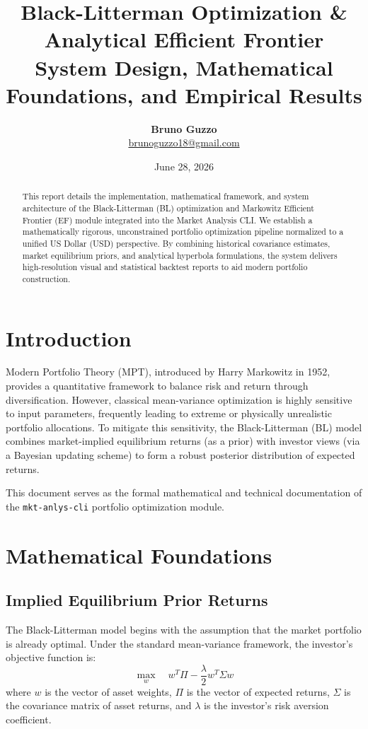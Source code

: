 \documentclass[11pt,a4paper]{article}
\title{\textbf{\Large Black-Litterman Optimization \& Analytical Efficient Frontier}\\
\large System Design, Mathematical Foundations, and Empirical Results}
\author{\textbf{Bruno Guzzo} \\ \href{mailto:brunoguzzo18@gmail.com}{brunoguzzo18@gmail.com}}
\date{June 28, 2026}
\begin{document}
\maketitle

\begin{abstract}
This report details the implementation, mathematical framework, and system architecture of the Black-Litterman (BL) optimization and Markowitz Efficient Frontier (EF) module integrated into the Market Analysis CLI. We establish a mathematically rigorous, unconstrained portfolio optimization pipeline normalized to a unified US Dollar (USD) perspective. By combining historical covariance estimates, market equilibrium priors, and analytical hyperbola formulations, the system delivers high-resolution visual and statistical backtest reports to aid modern portfolio construction.
\end{abstract}

\section{Introduction}
Modern Portfolio Theory (MPT), introduced by Harry Markowitz in 1952, provides a quantitative framework to balance risk and return through diversification. However, classical mean-variance optimization is highly sensitive to input parameters, frequently leading to extreme or physically unrealistic portfolio allocations. To mitigate this sensitivity, the Black-Litterman (BL) model combines market-implied equilibrium returns (as a prior) with investor views (via a Bayesian updating scheme) to form a robust posterior distribution of expected returns.

This document serves as the formal mathematical and technical documentation of the \texttt{mkt-anlys-cli} portfolio optimization module.

\section{Mathematical Foundations}

\subsection{Implied Equilibrium Prior Returns}
The Black-Litterman model begins with the assumption that the market portfolio is already optimal. Under the standard mean-variance framework, the investor's objective function is:
\begin{equation}
\max_{w} \quad w^T \Pi - \frac{\lambda}{2} w^T \Sigma w
\end{equation}
where $w$ is the vector of asset weights, $\Pi$ is the vector of expected returns, $\Sigma$ is the covariance matrix of asset returns, and $\lambda$ is the investor's risk aversion coefficient. 
\end{document}
